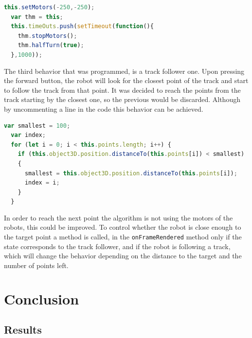 \documentclass{scrreprt}
\begin{document}
\begin{lstlisting}[language=JavaScript, gobble=2, basicstyle=\ttfamily\small]
  this.setMotors(-250,-250);
  var thm = this;
  this.timeOuts.push(setTimeout(function(){
    thm.stopMotors();
    thm.halfTurn(true);
  },1000));
\end{lstlisting} 

The third behavior that was programmed, is a track follower one. Upon pressing the forward button, the robot will look for the closest point of the track and start to follow the track from that point.
It was decided to reach the points from the track starting by the closest one, so the previous would be discarded. Although by uncommenting a line in the code this behavior can be achieved.

\begin{lstlisting}[language=JavaScript, gobble=2, basicstyle=\ttfamily\small]
  var smallest = 100;
  var index;
  for (let i = 0; i < this.points.length; i++) {
    if (this.object3D.position.distanceTo(this.points[i]) < smallest)
    {
      smallest = this.object3D.position.distanceTo(this.points[i]);
      index = i;
    }            
  }
\end{lstlisting}

In order to reach the next point the algorithm is not using the motors of the robots, this could be improved. To control whether the robot is close enough to the target point a method is called, in the \texttt{onFrameRendered} method only if the state corresponds to the track follower,
and if the robot is following a track, which will change the behavior depending on the distance to the target and the number of points left.

\chapter{Conclusion}

\section{Results}
\end{document}
